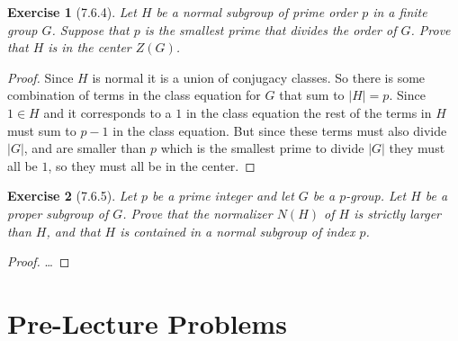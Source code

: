 \documentclass[12pt]{article}
\newtheorem*{exer}{Exercise}
\begin{document}

\begin{exer}[7.6.4]

    Let $H$ be a normal subgroup of prime order $p$ in a finite group
    $G$. Suppose that $p$ is the smallest prime that divides the order
    of $G$. Prove that $H$ is in the center $Z(G)$.

\end{exer}

\begin{proof}

    Since $H$ is normal it is a union of conjugacy classes. So there is
    some combination of terms in the class equation for $G$ that sum to
    $|H| = p$. Since $1 \in H$ and it corresponds to a $1$ in the class
    equation the rest of the terms in $H$ must sum to $p - 1$ in the
    class equation. But since these terms must also divide $|G|$, and
    are smaller than $p$ which is the smallest prime to divide $|G|$
    they must all be $1$, so they must all be in the center.

\end{proof}


\begin{exer}[7.6.5]

    Let $p$ be a prime integer and let $G$ be a $p$-group. Let $H$ be a
    proper subgroup of $G$. Prove that the normalizer $N(H)$ of $H$ is
    strictly larger than $H$, and that $H$ is contained in a normal
    subgroup of index $p$.

\end{exer}

\begin{proof}

    \dots 

\end{proof}


\section*{Pre-Lecture Problems}
\end{document}
